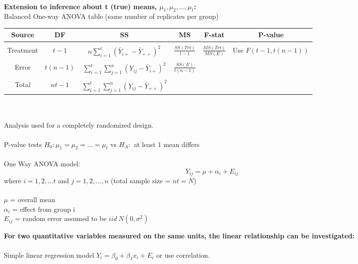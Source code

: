 ~\\

\noindent\large \textbf{Extension to inference about t (true) means, $\mu_1, \mu_2, ..., \mu_t$:}\normalsize\\
Balanced One-way ANOVA table (same number of replicates per group)\\
\begin{center}
\begin{tabular}{c|c|c|c|c|c}
Source & DF & SS & MS & F-stat & P-value\\
\hline& & & & &\\
Treatment & $t-1$ & $n\sum_{i=1}^{t}(\bar{Y}_{i+}-\bar{Y}_{++})^2$ & $\frac{SS(Trt)}{t-1}$ & $\frac{MS(Trt)}{MS(E)}$ & Use $F(t-1,t(n-1))$\\& & & & &\\
Error & $t(n-1)$ & $\sum_{i=1}^{t}\sum_{j=1}^{n}(Y_{ij}-\bar{Y}_{i+})^2$ & $\frac{SS(E)}{t(n-1)}$ &  & \\& & & & &\\
Total & $nt-1$ & $\sum_{i=1}^{t}\sum_{j=1}^{n}(Y_{ij}-\bar{Y}_{++})^2$ & & & \\
\end{tabular}
\end{center}

~\\~\\Analysis used for a completely randomized design.  \\~\\
P-value tests $H_0: \mu_1=\mu_2=...=\mu_t$ vs $H_A:$ at least 1 mean differs\\~\\
One Way ANOVA model:\\
$$Y_{ij}=\mu+\alpha_i+E_{ij}$$
where $i=1,2,...t$ and $j=1,2,...,n$ (total sample size = $nt=N$)\\~\\
$\mu$ = overall mean\\
$\alpha_i$ = effect from group i\\
 $E_{ij}$ = random error assumed to be $iid~N(0,\sigma^2)$

\newpage

\large \textbf{For two quantitative variables measured on the same units, the linear relationship can be investigated:}\normalsize\\~\\
Simple linear regression model $Y_i=\beta_0+\beta_1x_i+E_i$ or use correlation.\\~\\~\\

